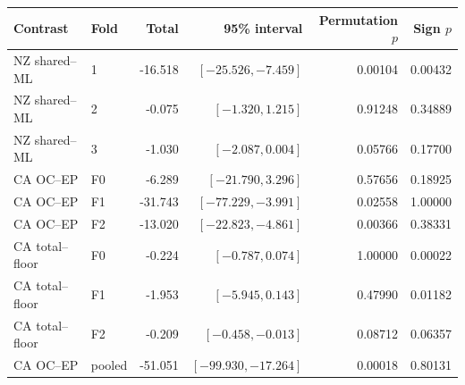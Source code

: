\begin{tabular}{llrrrr}
\toprule
Contrast & Fold & Total & 95\% interval & Permutation $p$ & Sign $p$ \\
\midrule
NZ shared--ML & 1 & -16.518 & $[-25.526,-7.459]$ & 0.00104 & 0.00432 \\
NZ shared--ML & 2 & -0.075 & $[-1.320,1.215]$ & 0.91248 & 0.34889 \\
NZ shared--ML & 3 & -1.030 & $[-2.087,0.004]$ & 0.05766 & 0.17700 \\
CA OC--EP & F0 & -6.289 & $[-21.790,3.296]$ & 0.57656 & 0.18925 \\
CA OC--EP & F1 & -31.743 & $[-77.229,-3.991]$ & 0.02558 & 1.00000 \\
CA OC--EP & F2 & -13.020 & $[-22.823,-4.861]$ & 0.00366 & 0.38331 \\
CA total--floor & F0 & -0.224 & $[-0.787,0.074]$ & 1.00000 & 0.00022 \\
CA total--floor & F1 & -1.953 & $[-5.945,0.143]$ & 0.47990 & 0.01182 \\
CA total--floor & F2 & -0.209 & $[-0.458,-0.013]$ & 0.08712 & 0.06357 \\
\midrule
CA OC--EP & pooled & -51.051 & $[-99.930,-17.264]$ & 0.00018 & 0.80131 \\
\bottomrule
\end{tabular}
